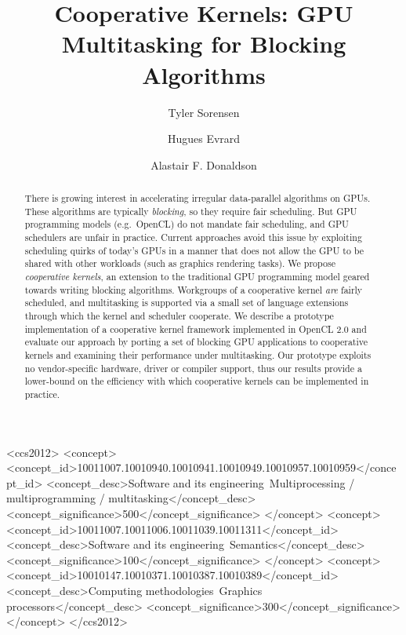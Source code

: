 \documentclass[sigconf]{acmart}
\begin{document}
\title{Cooperative Kernels: GPU Multitasking for Blocking Algorithms}

\author{Tyler Sorensen}

\author{Hugues Evrard}


\author{Alastair F. Donaldson}



\begin{abstract}
There is growing interest in accelerating irregular data-parallel
algorithms on GPUs.  These algorithms are typically \emph{blocking},
so they require fair scheduling.  But GPU programming models
(e.g.\ OpenCL) do not mandate fair scheduling, and GPU schedulers are
unfair in practice.  Current approaches avoid this issue by exploiting
scheduling quirks of today's GPUs in a manner that does not allow the
GPU to be shared with other workloads (such as graphics rendering
tasks).  We propose \emph{cooperative kernels}, an extension to the
traditional GPU programming model geared towards writing blocking
algorithms.  Workgroups of a cooperative kernel \emph{are} fairly
scheduled, and multitasking is supported via a small set of language
extensions through which the kernel and scheduler cooperate.  We
describe a prototype implementation of a cooperative kernel framework
implemented in OpenCL 2.0 and evaluate our approach by porting a set
of blocking GPU applications to cooperative kernels and examining
their performance under multitasking.  Our prototype exploits no
vendor-specific hardware, driver or compiler support, thus our results
provide a lower-bound on the efficiency with which cooperative kernels
can be implemented in practice.

\end{abstract}

\begin{CCSXML}
<ccs2012>
<concept>
<concept_id>10011007.10010940.10010941.10010949.10010957.10010959</concept_id>
<concept_desc>Software and its engineering~Multiprocessing / multiprogramming / multitasking</concept_desc>
<concept_significance>500</concept_significance>
</concept>
<concept>
<concept_id>10011007.10011006.10011039.10011311</concept_id>
<concept_desc>Software and its engineering~Semantics</concept_desc>
<concept_significance>100</concept_significance>
</concept>
<concept>
<concept_id>10010147.10010371.10010387.10010389</concept_id>
<concept_desc>Computing methodologies~Graphics processors</concept_desc>
<concept_significance>300</concept_significance>
</concept>
</ccs2012>
\end{CCSXML}
\end{document}
